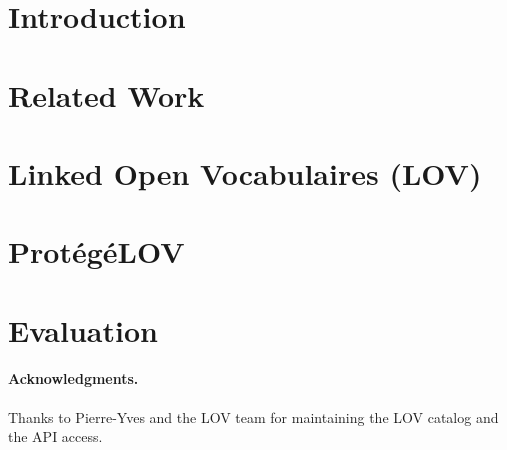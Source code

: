 \documentclass[runningheads,a4paper]{llncs}
\begin{document}

\vspace{-3mm}
\section{Introduction}\label{sec:introduction}




\vspace{-3mm}
\section{Related Work}\label{sec:soa}
\vspace{-3mm}



\vspace{-3mm}
\section{Linked Open Vocabulaires (LOV)}\label{sec:lov}
\vspace{-3mm}




\vspace{-3mm}
\section{Prot{\'e}g{\'e}LOV}\label{sec:classification}



\vspace{-3mm}
\section{Evaluation}\label{sec:conclusion}




\vspace{-1mm}
\paragraph{\textbf{Acknowledgments.}} %
Thanks to Pierre-Yves and the LOV team for maintaining the LOV catalog and the API access.
\vspace{-3mm}


\end{document}

